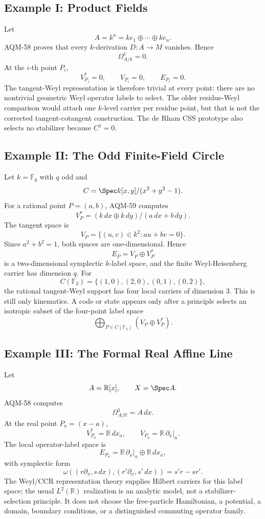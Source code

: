 \subsection{Example I: Product Fields}

Let
\[
  A=k^n=k e_1\oplus\cdots\oplus k e_n .
\]
AQM-58 proves that every \(k\)-derivation \(D:A\to M\) vanishes.  Hence
\[
  \Omega^1_{A/k}=0.
\]
At the \(i\)-th point \(P_i\),
\[
  V_{P_i}^*=0,\qquad V_{P_i}=0,\qquad E_{P_i}=0.
\]
The tangent-Weyl representation is therefore trivial at every point: there are
no nontrivial geometric Weyl operator labels to select.  The older residue-Weyl
comparison would attach one \(k\)-level carrier per residue point, but that is
not the corrected tangent-cotangent construction.  The de Rham CSS prototype
also selects no stabilizer because \(C^1=0\).

\subsection{Example II: The Odd Finite-Field Circle}

Let \(k=\mathbb F_q\) with \(q\) odd and
\[
  C=\Spec k[x,y]/(x^2+y^2-1).
\]
For a rational point \(P=(a,b)\), AQM-59 computes
\[
  V_P^*=(k\,dx\oplus k\,dy)/(a\,dx+b\,dy).
\]
The tangent space is
\[
  V_P=\{(u,v)\in k^2:au+bv=0\}.
\]
Since \(a^2+b^2=1\), both spaces are one-dimensional.  Hence
\[
  E_P=V_P\oplus V_P^*
\]
is a two-dimensional symplectic \(k\)-label space, and the finite
Weyl-Heisenberg carrier has dimension \(q\).  For
\[
  C(\mathbb F_3)=\{(1,0),(2,0),(0,1),(0,2)\},
\]
the rational tangent-Weyl support has four local carriers of dimension \(3\).
This is still only kinematics.  A code or state appears only after a principle
selects an isotropic subset of the four-point label space
\[
  \bigoplus_{P\in C(\mathbb F_3)}(V_P\oplus V_P^*).
\]

\subsection{Example III: The Formal Real Affine Line}

Let
\[
  A=\mathbb R[x],\qquad X=\Spec A.
\]
AQM-58 computes
\[
  \Omega^1_{A/\mathbb R}=A\,dx.
\]
At the real point \(P_a=(x-a)\),
\[
  V_{P_a}^*=\mathbb R\,dx_a,\qquad
  V_{P_a}=\mathbb R\,\partial_x|_a .
\]
The local operator-label space is
\[
  E_{P_a}=\mathbb R\,\partial_x|_a\oplus\mathbb R\,dx_a,
\]
with symplectic form
\[
  \omega((r\partial_x,s\,dx),(r'\partial_x,s'\,dx))=s'r-sr'.
\]
The Weyl/CCR representation theory supplies Hilbert carriers for this label
space; the usual \(L^2(\mathbb R)\) realization is an analytic model, not a
stabilizer-selection principle.  It does not choose the free-particle
Hamiltonian, a potential, a domain, boundary conditions, or a distinguished
commuting operator family.

